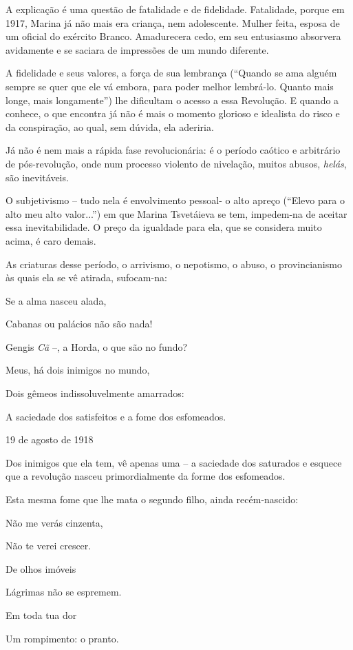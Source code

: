 A explicação é uma questão de fatalidade e de fidelidade. Fatalidade,
porque em 1917, Marina já não mais era criança, nem adolescente. Mulher
feita, esposa de um oficial do exército Branco. Amadurecera cedo, em seu
entusiasmo absorvera avidamente e se saciara de impressões de um mundo
diferente.

A fidelidade e seus valores, a força de sua lembrança (``Quando se ama
alguém sempre se quer que ele vá embora, para poder melhor lembrá-lo.
Quanto mais longe, mais longamente'') lhe dificultam o acesso a essa
Revolução. E quando a conhece, o que encontra já não é mais o momento
glorioso e idealista do risco e da conspiração, ao qual, sem dúvida, ela
aderiria.

Já não é nem mais a rápida fase revolucionária: é o período caótico e
arbitrário de pós-revolução, onde num processo violento de nivelação,
muitos abusos, \emph{helás}, são inevitáveis.

O subjetivismo -- tudo nela é envolvimento pessoal- o alto apreço
(``Elevo para o alto meu alto valor...'') em que Marina Tsvetáieva se
tem, impedem-na de aceitar essa inevitabilidade. O preço da igualdade
para ela, que se considera muito acima, é caro demais.

As criaturas desse período, o arrivismo, o nepotismo, o abuso, o
provincianismo às quais ela se vê atirada, sufocam-na:

Se a alma nasceu alada,

Cabanas ou palácios não são nada!

Gengis \emph{Cã} --, a Horda, o que são no fundo?

Meus, há dois inimigos no mundo,

Dois gêmeos indissoluvelmente amarrados:

A saciedade dos satisfeitos e a fome dos esfomeados.

19 de agosto de 1918

Dos inimigos que ela tem, vê apenas uma -- a saciedade dos saturados e
esquece que a revolução nasceu primordialmente da forme dos esfomeados.

Esta mesma fome que lhe mata o segundo filho, ainda recém-nascido:

Não me verás cinzenta,

Não te verei crescer.

De olhos imóveis

Lágrimas não se espremem.

Em toda tua dor

Um rompimento: o pranto.

